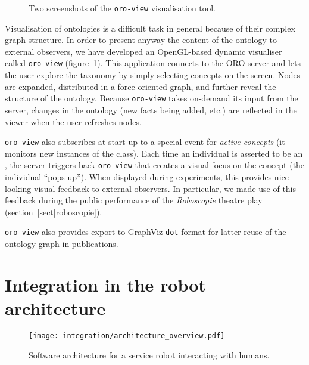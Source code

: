 \begin{figure}
    \centering
    \caption{Two screenshots of the {\tt oro-view} visualisation tool.}
    \label{fig|oroview}
\end{figure}

Visualisation of ontologies is a difficult task in general because of their
complex graph structure. In order to present anyway the content of the ontology
to external observers, we have developed an OpenGL-based dynamic visualiser
called {\tt oro-view} (figure~\ref{fig|oroview}). This application connects to
the ORO server and lets the user explore the taxonomy by simply selecting
concepts on the screen. Nodes are expanded, distributed in a force-oriented
graph, and further reveal the structure of the ontology. Because {\tt oro-view}
takes on-demand its input from the server, changes in the ontology (new facts
being added, etc.) are reflected in the viewer when the user refreshes nodes.

{\tt oro-view} also subscribes at start-up to a special event for \emph{active
concepts} (\ie it monitors new instances of the  class).
Each time an individual is asserted to be an , the
server triggers back {\tt oro-view} that creates a visual focus on the concept
(the individual ``pops up''). When displayed during experiments, this provides
nice-looking visual feedback to external observers. In particular, we made use
of this feedback during the public performance of the \emph{Roboscopie} theatre
play (section~\ref{sect|roboscopie}).

{\tt oro-view} also provides export to GraphViz {\tt dot} format for latter
reuse of the ontology graph in publications.

\section{Integration in the robot architecture}

\begin{figure*}[thpb]
  \centering
  \texttt{[image: integration/architecture\_overview.pdf]}
  \caption {Software architecture for a service robot interacting with humans.}
  \label{fig|archi}
\end{figure*}


